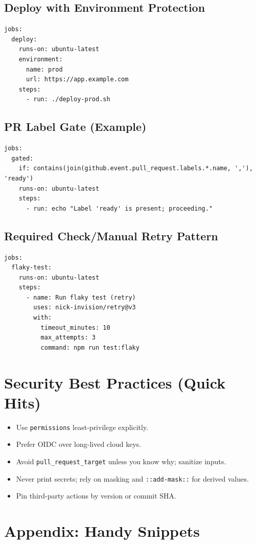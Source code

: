 \documentclass[11pt]{article}
\begin{document}
\subsection{Deploy with Environment Protection}
\begin{verbatim}
jobs:
  deploy:
    runs-on: ubuntu-latest
    environment:
      name: prod
      url: https://app.example.com
    steps:
      - run: ./deploy-prod.sh
\end{verbatim}

\subsection{PR Label Gate (Example)}
\begin{verbatim}
jobs:
  gated:
    if: contains(join(github.event.pull_request.labels.*.name, ','), 'ready')
    runs-on: ubuntu-latest
    steps:
      - run: echo "Label 'ready' is present; proceeding."
\end{verbatim}

\subsection{Required Check/Manual Retry Pattern}
\begin{verbatim}
jobs:
  flaky-test:
    runs-on: ubuntu-latest
    steps:
      - name: Run flaky test (retry)
        uses: nick-invision/retry@v3
        with:
          timeout_minutes: 10
          max_attempts: 3
          command: npm run test:flaky
\end{verbatim}

\section{Security Best Practices (Quick Hits)}
\begin{itemize}
  \item Use \texttt{permissions} least-privilege explicitly.
  \item Prefer OIDC over long-lived cloud keys.
  \item Avoid \texttt{pull\_request\_target} unless you know why; sanitize inputs.
  \item Never print secrets; rely on masking and \texttt{::add-mask::} for derived values.
  \item Pin third-party actions by version or commit SHA.
\end{itemize}

\section{Appendix: Handy Snippets}
\end{document}
